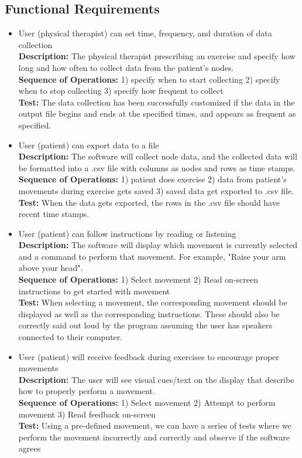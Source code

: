 \documentclass[onecolumn, draftclsnofoot,10pt, compsoc]{IEEEtran}
\begin{document}
\subsection{Functional Requirements}
\begin{itemize}
\item   User (physical therapist) can set time, frequency, and duration of data collection\\
\textbf{Description:} The physical therapist prescribing an exercise and specify how long and how often to collect data from the patient's nodes.\\
\textbf{Sequence of Operations:} 1) specify when to start collecting 2) specify when to stop collecting 3) specify how frequent to collect\\
\textbf{Test:} The data collection has been successfully customized if the data in the output file begins and ends at the specified times, and appears as frequent as specified.\\

\item   User (patient) can export data to a file\\
\textbf{Description:} The software will collect node data, and the collected data will be formatted into a .csv file with columns as nodes and rows as time stamps.\\
\textbf{Sequence of Operations:} 1) patient does exercise 2) data from patient's movements during exercise gets saved 3) saved data get exported to .csv file.\\
\textbf{Test:} When the data gets exported, the rows in the .csv file should have recent time stamps.\\

\item   User (patient) can follow instructions by reading or listening\\
\textbf{Description:} The software will display which movement is currently selected and a command to perform that movement. For example, "Raise your arm above your head".\\ 
\textbf{Sequence of Operations:} 1) Select movement 2) Read on-screen instructions to get started with movement\\
\textbf{Test:} When selecting a movement, the corresponding movement should be displayed as well as the corresponding instructions. These should also be correctly said out loud by the program assuming the user has speakers connected to their computer. \\

\item   User (patient) will receive feedback during exercises to encourage proper movements\\
\textbf{Description:} The user will see visual cues/text on the display that describe how to properly perform a movement. \\
\textbf{Sequence of Operations:} 1) Select movement 2) Attempt to perform movement 3) Read feedback on-screen\\
\textbf{Test:} Using a pre-defined movement, we can have a series of tests where we perform the movement incorrectly and correctly and observe if the software agrees

\end{itemize}
\end{document}
